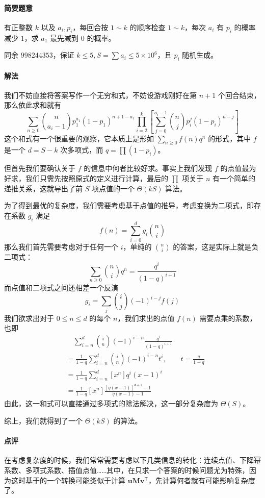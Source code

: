 \documentclass[12pt]{ctexart}
\theoremstyle{theorem}
\theoremstyle{theorem}
\begin{document}
\paragraph{简要题意} 有正整数 $k$ 以及 $a_i, p_i$，每回合按 $1\sim k$ 的顺序检查 $1\sim k$，每次 $a_i$ 有 $p_i$ 的概率减少 $1$，求 $a_1$ 最先减到 $0$ 的概率。

同余 $998244353$，保证 $k\le 5, S=\sum a_i \le 5\times 10^6$，且 $p_i$ 随机生成。

\paragraph{解法}

我们不妨直接将答案写作一个无穷和式，不妨设游戏刚好在第 $n+1$ 个回合结束，那么依此求和就有
$$
\sum_{n\ge 0} \binom n{a_i-1} p_1^{a_1} (1-p_1)^{n+1-a_1} \prod_{i=2}^k
\left[\sum_{j=0}^{a_i-1} \binom n j p_i^j(1-p_i)^{n-j}\right]
$$
这个和式有一个很重要的观察，它本质上是形如 $\sum_{n\ge 0} f(n) q^n$ 的形式，其中 $f$ 是一个 $d=S - k$ 次多项式，而 $q = \prod (1-p_i)$。

但首先我们要确认关于 $f$ 的信息中何者比较好求。事实上我们发现 $f$ 的点值最为好求，我们只需先按照原式的定义进行计算，最后的 $\prod$ 项关于 $n$ 有一个简单的递推关系，这就导出了前 $S$ 项点值的一个 $\Theta(kS)$ 算法。

为了得到最优的复杂度，我们需要考虑基于点值的推导，考虑变换为二项式，即存在系数 $g_i$ 满足
$$
f(n) = \sum_{i=0}^{d} g_i \binom n i
$$
那么我们首先需要考虑对于任何一个 $i$，单纯的 $\binom n i$ 的答案，这是实际上就是负二项式：
$$
\sum_{n\ge 0} \binom n i q^n = \frac{q^i}{(1-q)^{i+1}}
$$
而点值和二项式之间还相差一个反演
$$
g_i = \sum_j \binom i j (-1)^{i-j} f(j)
$$
我们欲求出对于 $0\le n\le d$ 的每个 $n$，我们求出的点值 $f(n)$ 需要点乘的系数，也即
\begin{align*}
&\quad \sum_{i=n}^{d}\binom i n (-1)^{i-n} \frac{q^i}{(1-q)^{i+1}}\\
&= \frac 1{1-q}\sum_{i=n}^{d}\binom i n (-1)^{i-n} t^i, \qquad t=\frac q{1-q}\\
&= \frac 1{1-q}\sum_{i=n}^{d} [x^n] q^i(x-1)^i\\
&= \frac 1{1-q}[x^n] \frac{[q(x-1)]^{d+1}-1}{q(x-1)-1}
\end{align*}
由此，这一和式可以直接通过多项式的除法解决，这一部分复杂度为 $\Theta(S)$。

综上，我们就得到了一个 $\Theta(kS)$ 的算法。

\paragraph{点评} 在考虑复杂度的时候，我们常常需要考虑以下几类信息的转化：连续点值、下降幂系数、多项式系数、插值点值……其中，在只求一个答案的时候问题尤为特殊，因为这时基于的一个转换可能类似于计算 $\mathbf {uM}\mathbf v^{\mathsf T}$，先计算何者就有可能影响复杂度了。
\end{document}
